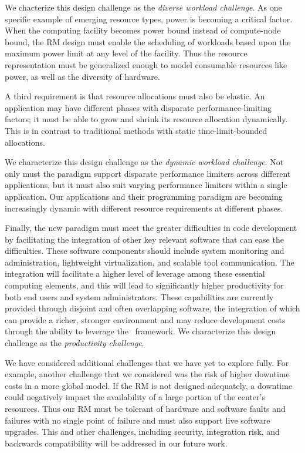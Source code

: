 We chacterize this design challenge as the {\em diverse workload
challenge}.   As one specific example of emerging resource types,
power is becoming a critical factor. When the computing facility
becomes power bound instead of compute-node bound, the RM design
must enable the scheduling of workloads based upon the maximum
power limit at any level of the facility. Thus the resource
representation must be generalized enough to model consumable
resources like power, as well as the diversity of hardware.

A third requirement is that resource allocations
must also be elastic. An application may have different
phases with disparate performance-limiting factors;
it must be able to grow and shrink its resource allocation
dynamically.  This is in contrast to traditional methods with
static time-limit-bounded allocations.

We characterize this design challenge as the {\em dynamic workload
challenge}.  
Not only must the paradigm support disparate performance limiters
across different applications, but it must also suit varying
performance limiters within a single application. Our applications
and their programming paradigm are becoming increasingly dynamic with
different resource requirements at different phases.

Finally, the new paradigm must meet the greater difficulties
in code development by facilitating the integration 
of other key relevant software that can ease the difficulties. 
These software components should include system monitoring
and administration, lightweight virtualization,
and scalable tool communication.
The integration will facilitate a higher level of
leverage among these essential computing elements,
and this will lead to significantly higher productivity
for both end users and system administrators.
These capabilities are currently provided
through disjoint and often overlapping software,
the integration of which can provide a richer, stronger environment
and may reduce development costs through the ability to leverage
the \flux\ framework.
We characterize this design challenge as the {\em productivity challenge}.

We have considered additional challenges that we
have yet to explore fully. For example,
another challenge that we considered was 
the risk of higher downtime costs in a more global model.
If the RM is not designed adequately, a downtime could negatively
impact the availability of a large portion of the center's
resources. Thus our RM must be tolerant of hardware and software
faults and failures with no single point of failure and must
also support live software upgrades. This and other challenges,
including security, integration risk, and backwards compatibility 
will be addressed in our future work.

%
